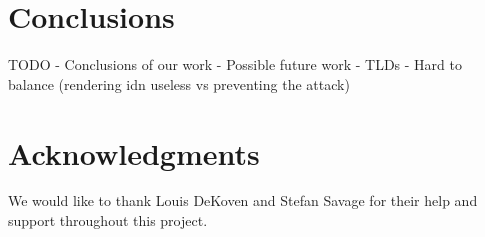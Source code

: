 \documentclass[letterpaper,twocolumn,10pt]{article}
\begin{document}
\section{Conclusions}
TODO
- Conclusions of our work
- Possible future work
- TLDs
- Hard to balance (rendering idn useless vs preventing the attack)

\section*{Acknowledgments}
We would like to thank Louis DeKoven and Stefan Savage for their help and support throughout this project.

{\footnotesize 
}

\theendnotes
\end{document}
